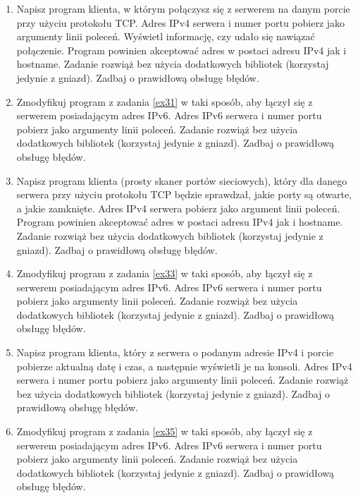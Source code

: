 \documentclass{article}
\begin{document}
\begin{enumerate}[label=\textbf{3.\arabic*}]\setlength{\itemsep}{1em}
    \item \label{ex31} Napisz program klienta, w którym połączysz się z serwerem na danym porcie przy użyciu protokołu TCP. Adres IPv4 serwera i numer portu pobierz jako argumenty linii poleceń. Wyświetl informację, czy udało się nawiązać połączenie. Program powinien akceptować adres w postaci adresu IPv4 jak i hostname. Zadanie rozwiąż bez użycia dodatkowych bibliotek (korzystaj jedynie z gniazd). Zadbaj o prawidłową obsługę błędów. 
    
    \item Zmodyfikuj program z zadania \ref{ex31} w taki sposób, aby łączył się z serwerem posiadającym adres IPv6.  Adres IPv6 serwera i numer portu pobierz jako argumenty linii poleceń. Zadanie rozwiąż bez użycia dodatkowych bibliotek (korzystaj jedynie z gniazd). Zadbaj o prawidłową obsługę błędów. 
    
    \item \label{ex33} Napisz program klienta (prosty skaner portów sieciowych), który dla danego serwera przy użyciu protokołu TCP będzie sprawdzał, jakie porty są otwarte, a jakie zamknięte. Adres IPv4 serwera pobierz jako argument linii poleceń. Program powinien akceptować adres w postaci adresu IPv4 jak i hostname.  Zadanie rozwiąż bez użycia dodatkowych bibliotek (korzystaj jedynie z gniazd). Zadbaj o prawidłową obsługę błędów. 
    
    \item  Zmodyfikuj program z zadania \ref{ex33} w taki sposób,  aby łączył się z serwerem posiadającym adres IPv6.  Adres IPv6 serwera i numer portu pobierz jako argumenty linii poleceń. Zadanie rozwiąż bez użycia dodatkowych bibliotek (korzystaj jedynie z gniazd). Zadbaj o prawidłową obsługę błędów. 
    
    \item \label{ex35} Napisz program klienta, który z serwera o podanym adresie IPv4 i porcie pobierze aktualną datę i czas, a następnie wyświetli je na konsoli.  Adres IPv4 serwera i numer portu pobierz jako argumenty linii poleceń. Zadanie rozwiąż bez użycia dodatkowych bibliotek (korzystaj jedynie z gniazd). Zadbaj o prawidłową obsługę błędów. 
    
     \item Zmodyfikuj program z zadania \ref{ex35} w taki sposób,  aby łączył się z serwerem posiadającym adres IPv6.  Adres IPv6 serwera i numer portu pobierz jako argumenty linii poleceń. Zadanie rozwiąż bez użycia dodatkowych bibliotek (korzystaj jedynie z gniazd). Zadbaj o prawidłową obsługę błędów. 
     

\end{enumerate}
\end{document}
